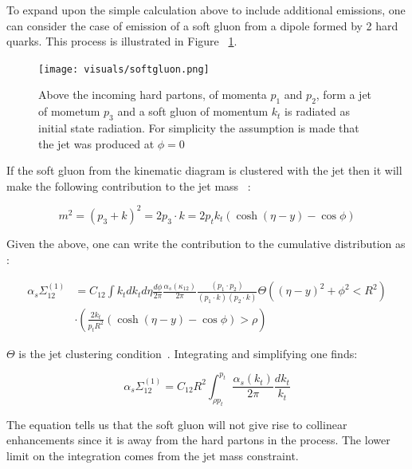 To expand upon the simple calculation above to include additional emissions, one can consider the case of emission of a soft gluon from a dipole formed by 2 hard quarks. This process is illustrated in Figure ~\ref{softgluon}.



\begin{figure}[htb]
\centering
\texttt{[image: visuals/softgluon.png]}
\caption{Above the incoming hard partons, of momenta $p_1$ and $p_2$, form a jet of mometum $p_3$ and a soft gluon of momentum $k_t$ is radiated as initial state radiation. For simplicity the assumption is made that the jet was produced at $\phi = 0$  }
\label{softgluon}
\end{figure}


If the soft gluon from the kinematic diagram is clustered with the jet then it will make the following contribution to the jet mass ~\cite{Marzani:2019hun}:\newline


\begin{equation}
m^{2}=\left(p_{3}+k\right)^{2}=2 p_{3} \cdot k=2 p_{t} k_{t}(\cosh (\eta-y)-\cos \phi)
\end{equation}

Given the above, one can write the contribution to the cumulative distribution as :\newline

\begin{equation}
\begin{aligned} \alpha_{s} \Sigma_{12}^{(1)} &=C_{12} \int k_{t} d k_{t} d \eta \frac{d \phi}{2 \pi} \frac{\alpha_{s}\left(\kappa_{12}\right)}{2 \pi} \frac{\left(p_{1} \cdot p_{2}\right)}{\left(p_{1} \cdot k\right)\left(p_{2} \cdot k\right)} \Theta\left((\eta-y)^{2}+\phi^{2}<R^{2}\right) \\ & \cdot\left(\frac{2 k_{t}}{p_{t} R^{2}}(\cosh (\eta-y)-\cos \phi)>\rho\right) \end{aligned}
\end{equation}

$\Theta$ is the jet clustering condition~\cite{Marzani:2019hun}. Integrating and simplifying one finds:\newline

\begin{equation}
\alpha_{s} \Sigma_{12}^{(1)}=C_{12} R^{2} \int_{\rho p_{t}}^{p_{t}} \frac{\alpha_{s}\left(k_{t}\right)}{2 \pi} \frac{d k_{t}}{k_{t}}
\end{equation}

The equation tells us that the soft gluon will not give rise to collinear enhancements since it is away from the hard partons in the process. The lower limit on the integration comes from the jet mass constraint.

